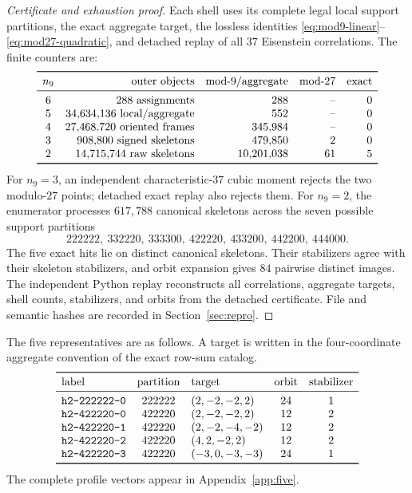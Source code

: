 \documentclass[11pt]{article}
\theoremstyle{remark}
\begin{document}
\begin{proof}[Certificate and exhaustion proof]
Each shell uses its complete legal local support partitions, the exact
aggregate target, the lossless identities
\eqref{eq:mod9-linear}--\eqref{eq:mod27-quadratic}, and detached replay of
all $37$ Eisenstein correlations.  The finite counters are:
\[
\begin{array}{c@{\quad}r@{\quad}r@{\quad}r@{\quad}r}
\toprule
n_9 & \text{outer objects} & \text{mod-9/aggregate} &
\text{mod-27} & \text{exact}\\
\midrule
6 & 288\ \text{assignments} & 288 & \text{--} & 0\\
5 & 34{,}634{,}136\ \text{local/aggregate} & 552 & \text{--} & 0\\
4 & 27{,}468{,}720\ \text{oriented frames} & 345{,}984 & \text{--} & 0\\
3 & 908{,}800\ \text{signed skeletons} & 479{,}850 & 2 & 0\\
2 & 14{,}715{,}744\ \text{raw skeletons} & 10{,}201{,}038 & 61 & 5\\
\bottomrule
\end{array}
\]
For $n_9=3$, an independent characteristic-$37$ cubic moment rejects the
two modulo-$27$ points; detached exact replay also rejects them.  For
$n_9=2$, the enumerator processes $617{,}788$ canonical skeletons across
the seven possible support partitions
\[
222222,\ 332220,\ 333300,\ 422220,\ 433200,\ 442200,\ 444000.
\]
The five exact hits lie on distinct canonical skeletons.  Their stabilizers
agree with their skeleton stabilizers, and orbit expansion gives $84$
pairwise distinct images.  The independent Python replay reconstructs all
correlations, aggregate targets, shell counts, stabilizers, and orbits from
the detached certificate.  File and semantic hashes are recorded in
Section~\ref{sec:repro}.
\end{proof}

The five representatives are as follows.  A target is written in the
four-coordinate aggregate convention of the exact row-sum catalog.
\[
\begin{array}{lclcc}
\toprule
\text{label}&\text{partition}&\text{target}&\text{orbit}&\text{stabilizer}\\
\midrule
\texttt{h2-222222-0}&222222&(2,-2,-2,2)&24&1\\
\texttt{h2-422220-0}&422220&(2,-2,-2,2)&12&2\\
\texttt{h2-422220-1}&422220&(2,-2,-4,-2)&12&2\\
\texttt{h2-422220-2}&422220&(4,2,-2,2)&12&2\\
\texttt{h2-422220-3}&422220&(-3,0,-3,-3)&24&1\\
\bottomrule
\end{array}
\]
The complete profile vectors appear in Appendix~\ref{app:five}.
\end{document}
